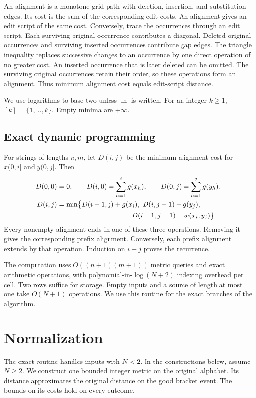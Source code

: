 \documentclass[11pt]{article}
\theoremstyle{definition}
\newcommand{\1}{\mathbf 1}
\begin{document}
An alignment is a monotone grid path with deletion, insertion, and
substitution edges. Its cost is the sum of the corresponding edit costs.
An alignment gives an edit script of the same cost.
Conversely, trace the occurrences through an edit script.
Each surviving original occurrence contributes a diagonal.
Deleted original occurrences and surviving inserted occurrences contribute
gap edges. The triangle inequality replaces successive changes to an
occurrence by one direct operation of no greater cost.
An inserted occurrence that is later deleted can be omitted.
The surviving original occurrences retain their order, so these operations
form an alignment. Thus minimum alignment cost equals edit-script distance.

We use logarithms to base two unless $\ln$ is written.
For an integer $k\ge1$, $[k]=\{1,\ldots,k\}$.
Empty minima are $+\infty$.

\subsection{Exact dynamic programming}

For strings of lengths $n,m$, let $D(i,j)$ be the minimum alignment cost
for $x(0,i]$ and $y(0,j]$. Then
\begin{align*}
 D(0,0)&=0,\qquad D(i,0)=\sum_{h=1}^i g(x_h),\qquad
 D(0,j)=\sum_{h=1}^j g(y_h),\\
 D(i,j)&=\min\bigl\{
 D(i-1,j)+g(x_i),\ D(i,j-1)+g(y_j),\\
 &\hspace{38mm}D(i-1,j-1)+w(x_i,y_j)\bigr\}.
\end{align*}
Every nonempty alignment ends in one of these three operations.
Removing it gives the corresponding prefix alignment.
Conversely, each prefix alignment extends by that operation.
Induction on $i+j$ proves the recurrence.

The computation uses $O((n+1)(m+1))$ metric queries and exact arithmetic
operations, with polynomial-in-$\log(N+2)$ indexing overhead per cell.
Two rows suffice for storage.
Empty inputs and a source of length at most one take $O(N+1)$ operations.
We use this routine for the exact branches of the algorithm.

\section{Normalization}\label{paper:sec:normalization}

The exact routine handles inputs with $N<2$. In the constructions below,
assume $N\ge2$. We construct one bounded integer metric on the original
alphabet. Its distance approximates the original distance on the good
bracket event. The bounds on its costs hold on every outcome.
\end{document}
